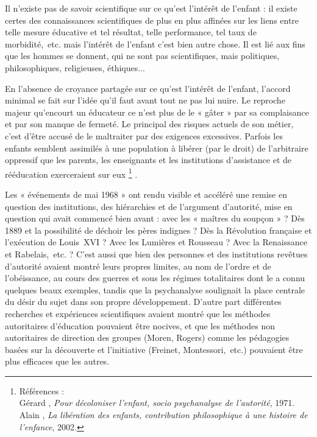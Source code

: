 \begin{table}[t]
\begin{table}[t]
 Il n'existe pas de savoir scientifique sur ce qu'est l'intérêt de l'enfant : il existe certes des connaissances scientifiques de plus en plus affinées sur les liens entre telle mesure éducative et tel résultat, telle performance, tel taux de morbidité,~etc. mais l'intérêt de l'enfant c'est bien autre chose. Il est lié aux fins que les hommes se donnent, qui ne sont pas scientifiques, mais politiques, philosophiques, religieuses, éthiques... 

 En l'absence de croyance partagée sur ce qu'est l'intérêt de l'enfant, l'accord minimal se fait sur l'idée qu'il faut avant tout ne pas lui nuire. Le reproche majeur qu'encourt un éducateur ce n'est plus de le « gâter » par sa complaisance et par son manque de fermeté. Le principal des risques actuels de son métier, c'est d'être accusé de le maltraiter par des exigences excessives. Parfois les enfants semblent assimilés à une population à libérer (par le droit) de l'arbitraire oppressif que les parents, les enseignants et les institutions d'assistance et de rééducation exerceraient sur eux%
\footnote{Références : 
\\Gérard , \emph{Pour décoloniser l'enfant, socio psychanalyse de l'autorité}, 1971.
\\Alain {}, \emph{La libération des enfants, contribution philosophique à une histoire de l'enfance}, 2002.}%
.

 Les « {événements de mai 1968} » ont rendu visible et accéléré une remise en question des institutions, des hiérarchies et de l'argument d'autorité, mise en question qui avait commencé bien avant : avec les « maîtres du soupçon » ? Dès 1889 et la possibilité de déchoir les pères indignes ? Dès la Révolution française et l'exécution de Louis~XVI ? Avec les Lumières et Rousseau ? Avec la Renaissance et Rabelais,~etc. ? C'est aussi que bien des personnes et des institutions revêtues d'autorité avaient montré leurs propres limites, au nom de l'ordre et de l'obéissance, au cours des guerres et sous les régimes totalitaires dont le  a connu quelques beaux exemples, tandis que la psychanalyse soulignait la place centrale du désir du sujet dans son propre développement. D'autre part différentes recherches et expériences scientifiques avaient montré que les méthodes autoritaires d'éducation pouvaient être nocives, et que les méthodes non autoritaires de direction des groupes (Moren, Rogers) comme les pédagogies basées sur la découverte et l'initiative (Freinet, Montessori,~etc.) pouvaient être plus efficaces que les autres.


\end{table}
\end{table}
